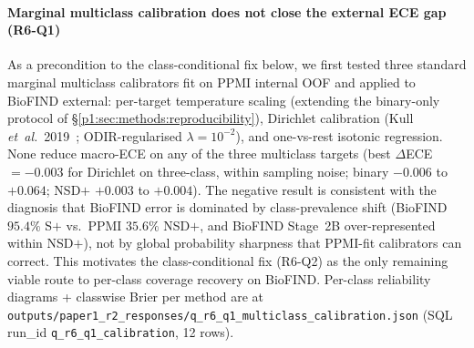 \paragraph*{Marginal multiclass calibration does not close the external ECE gap (R6-Q1)} As a precondition to the class-conditional fix below, we first tested three standard marginal multiclass calibrators fit on PPMI internal OOF and applied to BioFIND external: per-target temperature scaling (extending the binary-only protocol of \S\ref{p1:sec:methods:reproducibility}), Dirichlet calibration (Kull \emph{et~al.}~2019~\cite{kull2019dirichlet}; ODIR-regularised $\lambda{=}10^{-2}$), and one-vs-rest isotonic regression. None reduce macro-ECE on any of the three multiclass targets (best $\Delta$ECE $= -0.003$ for Dirichlet on three-class, within sampling noise; binary $-0.006$ to $+0.064$; NSD$+$ $+0.003$ to $+0.004$). The negative result is consistent with the diagnosis that BioFIND error is dominated by class-prevalence shift (BioFIND $95.4\%$ S$+$ vs.\ PPMI $35.6\%$ NSD$+$, and BioFIND Stage~2B over-represented within NSD$+$), not by global probability sharpness that PPMI-fit calibrators can correct. This motivates the class-conditional fix (R6-Q2) as the only remaining viable route to per-class coverage recovery on BioFIND. Per-class reliability diagrams + classwise Brier per method are at \texttt{outputs/paper1\_r2\_responses/q\_r6\_q1\_multiclass\_calibration.json} (SQL run\_id \texttt{q\_r6\_q1\_calibration}, 12 rows).

